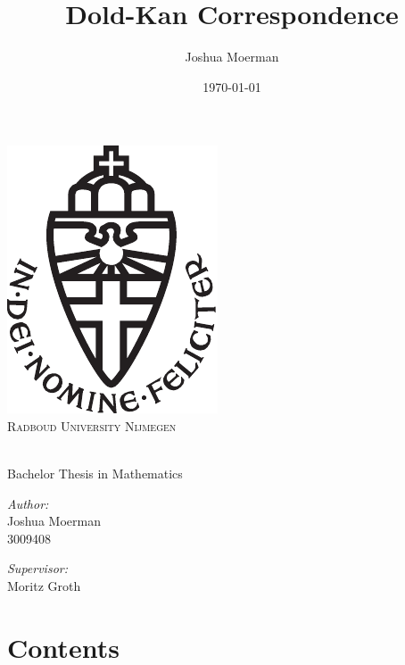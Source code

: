 \documentclass[titlepage, 11pt]{amsproc}
\title{Dold-Kan Correspondence}
\author{Joshua Moerman}
\date{\today}
\theoremstyle{plain}
\theoremstyle{definition}
\begin{document}
\begin{titlepage}
\centering
\vspace{10cm}

\includegraphics[scale=0.2]{ru}\\
\textsc{Radboud University Nijmegen}
\vspace{3cm}

{\huge \bfseries \makeatletter\@title\makeatother}\\
\vspace{0.3cm}
Bachelor Thesis in Mathematics
\vspace{3cm}

\begin{minipage}{0.4\textwidth}
\begin{flushleft} \large
\emph{Author:}\\
Joshua Moerman\\
3009408
\end{flushleft}
\end{minipage}
\begin{minipage}{0.4\textwidth}
\begin{flushright} \large
\emph{Supervisor:} \\
Moritz Groth
\end{flushright}
\end{minipage}

\vfill
\makeatletter\@date\makeatother

\end{titlepage}

\newpage
\thispagestyle{empty}
\mbox{}

\newpage
\section*{Contents}
\renewcommand\contentsname{}
\tableofcontents
\end{document}
